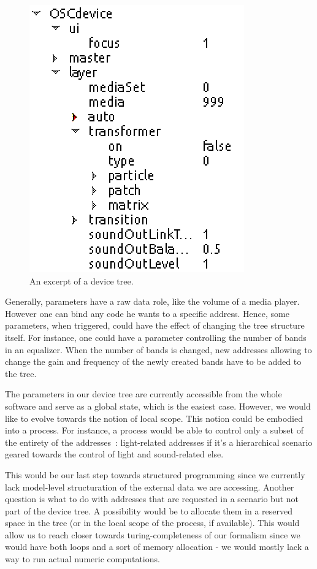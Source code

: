 \documentclass{sigchi}
\begin{document}
\begin{figure}
    \centering
    \includegraphics[scale=0.25]{images/tree.png}
    \caption{An excerpt of a device tree.}
    \label{fig.tree}
\end{figure}

Generally, parameters have a raw data role, like the volume of a media player. However one can bind any code he wants to a specific address. Hence, some parameters, when triggered, could have the effect of changing the tree structure itself. For instance, one could have a parameter controlling the number of bands in an equalizer. When the number of bands is changed, new addresses allowing to change the gain and frequency of the newly created bands have to be added to the tree.

The parameters in our device tree are currently accessible from the whole software and serve as a global state, which is the easiest case. However, we would like to evolve towards the notion of local scope. This notion could be embodied into a process. For instance, a process would be able to control only a subset of the entirety of the addresses~: light-related addresses if it's a hierarchical scenario geared towards the control of light and sound-related else.  

This would be our last step towards structured programming since we currently lack model-level structuration of the external data we are accessing. Another question is what to do with addresses that are requested in a scenario but not part of the device tree. A possibility would be to allocate them in a reserved space in the tree (or in the local scope of the process, if available). This would allow us to reach closer towards turing-completeness of our formalism since we would have both loops and a sort of memory allocation - we would mostly lack a way to run actual numeric computations.
\end{document}
